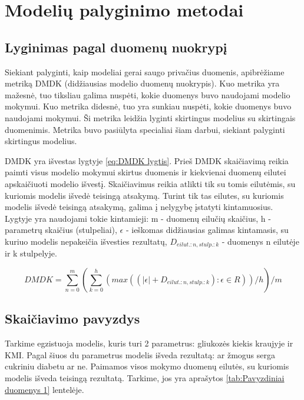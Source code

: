 \documentclass{VUMIFInfBakalaurinis}
\begin{document}
\section{Modelių palyginimo metodai}

\subsection{Lyginimas pagal duomenų nuokrypį}

\par Siekiant palyginti, kaip modeliai gerai saugo privačius duomenis, apibrėžiame metriką DMDK (didžiausias modelio duomenų nuokrypis). Kuo metrika yra mažesnė, tuo tiksliau galima nuspėti, kokie duomenys buvo naudojami modelio mokymui. Kuo metrika didesnė, tuo yra sunkiau nuspėti, kokie duomenys buvo naudojami mokymui. Ši metrika leidžia lyginti skirtingus modelius su skirtingais duomenimis. Metrika buvo pasiūlyta specialiai šiam darbui, siekiant palyginti skirtingus modelius.
\par DMDK yra išvestas lygtyje \eqref{eq:DMDK lygtis}. Prieš DMDK skaičiavimą reikia paimti visus modelio mokymui skirtus duomenis ir kiekvienai duomenų eilutei apskaičiuoti modelio išvestį. Skaičiavimus reikia atlikti tik su tomis eilutėmis, su kuriomis modelis išvedė teisingą atsakymą. Turint tik tas eilutes, su kuriomis modelis išvedė teisingą atsakymą, galima į nelygybę įstatyti kintamuosius. Lygtyje yra naudojami tokie kintamieji: m - duomenų eilučių skaičius, h - parametrų skaičius (stulpeliai), $\epsilon$ - ieškomas didžiausias galimas kintamasis, su kuriuo modelis nepakeičia išvesties rezultatų, $D_{eilut.:n, stulp.:k}$ - duomenys n eilutėje ir k stulpelyje.

\begin{equation}
DMDK = {\sum_{n=0}^{m} ({\sum_{k=0}^{h} (max((|\epsilon| + D_{eilut.:n, stulp.:k}) : \epsilon \in R))}/{h})}/{m}
\label{eq:DMDK lygtis}
\end{equation} 

\subsection{Skaičiavimo pavyzdys}
\par Tarkime egzistuoja modelis, kuris turi 2 parametrus: gliukozės kiekis kraujyje ir KMI. Pagal šiuos du parametrus modelis išveda rezultatą: ar žmogus serga cukriniu diabetu ar ne. Paimamos visos mokymo duomenų eilutės, su kuriomis modelis išveda teisingą rezultatą. Tarkime, jos yra aprašytos \ref{tab:Pavyzdiniai duomenys 1} lentelėje.
\end{document}
